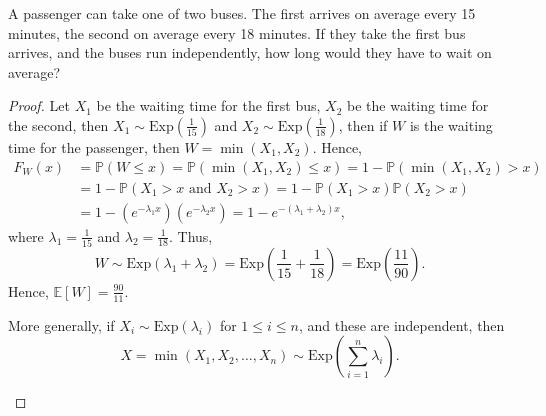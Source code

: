 \begin{eg}
    A passenger can take one of two buses. The first arrives on average every 15 minutes, the second on average every 18 minutes. If they take the first bus arrives, and the buses run independently, how long would they have to wait on average?
\end{eg}
\begin{proof}
    Let \(X_1\) be the waiting time for the first bus, \(X_2\) be the waiting time for the second, then \(X_1 \sim \mathrm{Exp}(\frac{1}{15}) \) and \(X_2 \sim \mathrm{Exp}(\frac{1}{18}) \), then if \(W\) is the waiting time for the passenger, then \(W = \min (X_1, X_2)\). Hence,
    \begin{align*}
        F_W(x) &= \mathbb{P} (W \le x) = \mathbb{P} (\min (X_1, X_2) \le x) = 1 - \mathbb{P} (\min (X_1, X_2) > x) \\
        &= 1 - \mathbb{P} (X_1 > x \text{ and } X_2 > x) = 1 - \mathbb{P} (X_1 > x) \mathbb{P} (X_2 > x) \\
        &= 1 - (e^{-\lambda _1 x}) (e^{-\lambda _2 x}) = 1 - e^{-(\lambda _1 + \lambda _2) x},
    \end{align*}      
    where \(\lambda _1 = \frac{1}{15}\) and \(\lambda _2 = \frac{1}{18}\). Thus,
    \[
        W \sim \mathrm{Exp}(\lambda _1 + \lambda _2) = \mathrm{Exp}\left( \frac{1}{15} + \frac{1}{18} \right) = \mathrm{Exp}\left( \frac{11}{90} \right).     
    \]  
    Hence, \(\mathbb{E} [W] = \frac{90}{11}\). 

    \begin{remark}
        More generally, if \(X_i \sim \mathrm{Exp}(\lambda _i) \) for \(1 \le i \le n\), and these are independent, then 
        \[
            X = \min (X_1, X_2, \dots , X_n) \sim \mathrm{Exp} \left( \sum_{i=1}^n \lambda _i  \right).  
        \]  
    \end{remark}
\end{proof}

